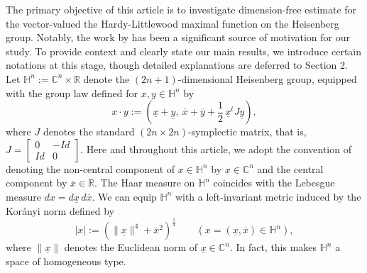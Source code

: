 \documentclass[11pt]{amsart}
\newcommand{\Ha}{\mathbb{H}^n}
\theoremstyle{definition}
\numberwithin{equation}{section}
\begin{document}
The primary objective of this article is to investigate dimension-free estimate for the vector-valued  the Hardy-Littlewood maximal function on the Heisenberg group.  Notably, the work by \cite{DK} has been a significant source of motivation for our study. To provide context and clearly state our main results, we introduce certain notations at this stage, though detailed explanations are deferred to Section 2. Let $ \mathbb{H}^n:= \mathbb{C}^n \times \mathbb{R} $ denote the $(2n + 1)$-dimensional Heisenberg group, equipped with the group law defined for $ x, y \in \mathbb{H}^n $ by  
\[
x \cdot y := \left( \underline{x} + \underline{y},~ \overline{x} + \overline{y} + \frac{1}{2} \, \underline{x}^t J \underline{y} \right),
\]  
where $ J $ denotes the standard $ (2n \times 2n) $-symplectic matrix, that is, $J=\begin{bmatrix}0& -Id\\
Id&0\end{bmatrix}$.  Here and throughout this article, we adopt the convention of denoting the non-central component of $ x \in \mathbb{H}^n $ by $ \underline{x} \in \mathbb{C}^n $ and the central component by $ \overline{x} \in \mathbb{R} $. The Haar measure on $\mathbb{H}^n$ coincides with the Lebesgue measure $dx=d\underline{x}\,d\overline{x}$. We can equip $\Ha$ with a left-invariant metric induced by
the Kor\'anyi norm  defined by
 \begin{equation*}
     |x|:= \left( \|\underline{x} \|^4 + \overline{x}^2 \right)^{\frac{1}{4}} \quad\quad (x=(\underline{x}, \overline{x}) \in \mathbb{H}^n),
 \end{equation*}
where $\| \underline{x}  \|$ denotes the Euclidean norm of $\underline{x} \in \mathbb{C}^{n}$. In fact, this makes $\Ha$ a space of homogeneous type.  
\end{document}

